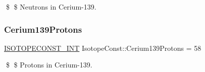 \$ \$ Neutrons in Cerium-\/139. \mbox{\label{group___isotope_const-_cerium-_ce139_ga63c27a31eb3cf260cc503360568b810b}} 
\subsubsection{\texorpdfstring{Cerium139\+Protons}{Cerium139Protons}}
{\footnotesize\ttfamily \mbox{\hyperlink{group___isotope_const-_macros_ga5f18360b3e99483a35c32d789e62621c}{I\+S\+O\+T\+O\+P\+E\+C\+O\+N\+S\+T\+\_\+\+I\+NT}} Isotope\+Const\+::\+Cerium139\+Protons = 58}

\$ \$ Protons in Cerium-\/139. 
